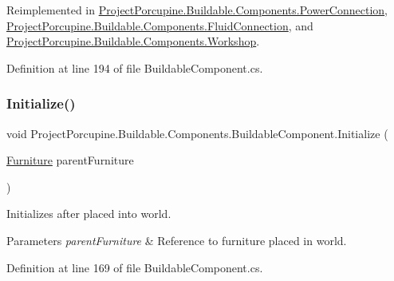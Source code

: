 Reimplemented in \hyperlink{class_project_porcupine_1_1_buildable_1_1_components_1_1_power_connection_a65a8b6edcd5f5ece2c1b8dc78e735597}{Project\+Porcupine.\+Buildable.\+Components.\+Power\+Connection}, \hyperlink{class_project_porcupine_1_1_buildable_1_1_components_1_1_fluid_connection_a61c5dde2b1470fc3127136891d4e9888}{Project\+Porcupine.\+Buildable.\+Components.\+Fluid\+Connection}, and \hyperlink{class_project_porcupine_1_1_buildable_1_1_components_1_1_workshop_ab72b89bcd9a1c02321dadd29368769d9}{Project\+Porcupine.\+Buildable.\+Components.\+Workshop}.



Definition at line 194 of file Buildable\+Component.\+cs.

\mbox{\label{class_project_porcupine_1_1_buildable_1_1_components_1_1_buildable_component_ac2ca9344f184cd922fa8a089a95f6765}} 
\subsubsection{\texorpdfstring{Initialize()}{Initialize()}\hspace{0.1cm}{\footnotesize\ttfamily [1/2]}}
{\footnotesize\ttfamily void Project\+Porcupine.\+Buildable.\+Components.\+Buildable\+Component.\+Initialize (\begin{DoxyParamCaption}\item[{\hyperlink{class_furniture}{Furniture}}]{parent\+Furniture }\end{DoxyParamCaption})}



Initializes after placed into world. 


\begin{DoxyParams}{Parameters}
{\em parent\+Furniture} & Reference to furniture placed in world.\\
\hline
\end{DoxyParams}


Definition at line 169 of file Buildable\+Component.\+cs.

\mbox{\label{class_project_porcupine_1_1_buildable_1_1_components_1_1_buildable_component_ac3050db5e9d240e7618ce156920a9dc6}} 
